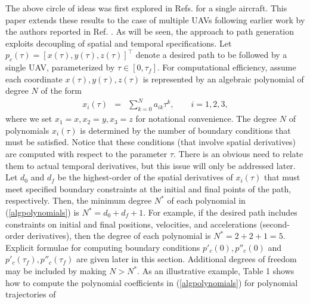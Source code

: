\documentclass[]{aiaa-tc}%
\begin{document}


The above circle of ideas was first explored in Refs. \cite{Neljubov,
Taranenko, Taranenko-Momdgi, Yakimenko} for a single aircraft. This paper
extends these results to the case of multiple UAVs following earlier work by
the authors reported in Ref. \cite{isaac_acc_06}. As will be seen, the
approach to path generation exploits decoupling of spatial and temporal
specifications. Let $p_c(\tau) = [x(\tau), y(\tau), z(\tau)]^{\top}$ denote
a desired path to be followed by a single UAV, parameterized by $\tau \in
[0, \tau_f]$. For computational efficiency, assume each coordinate $x
(\tau), y(\tau), z(\tau)$ is represented by an algebraic polynomial of
degree $N$ of the form
\begin{eqnarray} \label{algpolynomials} x_{i}(\tau) &=& \sum_{k =
0}^{N} a_{ik} \tau^k, \qquad i = 1,2,3, \end{eqnarray} where we set $x_{1} =
x, x_{2} = y, x_{3} = z$ for notational convenience. The degree $N$ of
polynomials $x_{i}(\tau)$ is determined by the number of boundary conditions
that must be satisfied. Notice that these conditions (that involve spatial
derivatives) are computed with respect to the parameter $\tau$. There is an
obvious need to relate them to actual temporal derivatives, but this issue
will only be addressed later. Let $d_0$ and $d_f$ be the highest-order of
the spatial derivatives of $x_{i}(\tau)$ that must meet specified boundary
constraints at the initial and final points of the path, respectively. Then,
the minimum degree $N^*$ of each polynomial in (\ref{algpolynomials}) is
$N^{*} = d_0 + d_f + 1$. For example, if the desired path includes
constraints on initial and final positions, velocities, and accelerations
(second-order derivatives), then the degree of each polynomial is $N^{*} = 2
+ 2 + 1 = 5$. Explicit formulae for computing boundary conditions $p'_c(0),
p''_c(0)$ and $p'_c(\tau_f), p''_c(\tau_f)$ are given later in this section.
Additional degrees of freedom may be included by making $N > N^*$. As an
illustrative example, Table 1 shows how to compute the polynomial
coefficients in (\ref{algpolynomials}) for polynomial trajectories of
\end{document}

